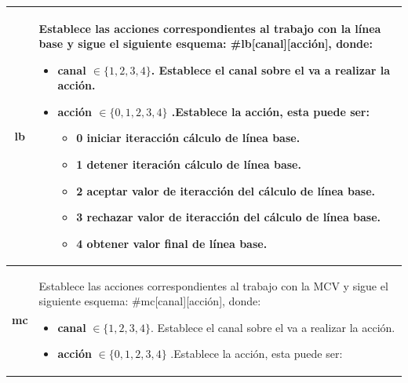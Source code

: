\begin{table}[h]
\begin{tabular}{ |c|p{14cm}|}
        \textbf{lb}     &   \begin{minipage}{14cm}
                                \vspace{1pt}
                                Establece las acciones correspondientes al trabajo con la línea base y sigue el siguiente esquema: \#lb[canal][acción], donde:
                                \begin{itemize}
                                    \item \textbf{canal} $\in \{1, 2, 3, 4\}$. Establece el canal sobre el va a realizar la acción.
                                    \item \textbf{acción} $\in \{0, 1, 2, 3, 4\}$ .Establece la acción, esta puede ser: 
                                    \begin{itemize}
                                        \item 0 iniciar iteracción cálculo de línea base.
                                        \item 1 detener iteración cálculo de línea base.
                                        \item 2 aceptar valor de iteracción del cálculo de línea base.
                                        \item 3 rechazar valor de iteracción del cálculo de línea base.
                                        \item 4 obtener valor final de línea base.
                                    \end{itemize}
                                \end{itemize} 
                                \vspace{1pt}
                            \end{minipage}\\\hline
        \textbf{mc}     &   \begin{minipage}{14cm}
                                \vspace{1pt}
                                Establece las acciones correspondientes al trabajo con la MCV y sigue el siguiente esquema: \#mc[canal][acción], donde:
                                \begin{itemize}
                                    \item \textbf{canal} $\in \{1, 2, 3, 4\}$. Establece el canal sobre el va a realizar la acción.
                                    \item \textbf{acción} $\in \{0, 1, 2, 3, 4\}$ .Establece la acción, esta puede ser: 

\end{itemize}
\end{minipage}
\end{tabular}
\end{table}
